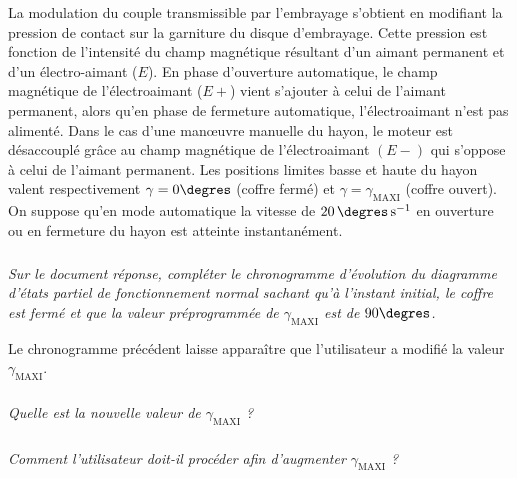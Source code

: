 \documentclass[10pt,fleqn]{article} %
\begin{document}
\begin{multicols}{2}
\begin{multicols}{2}
La modulation du couple transmissible par l’embrayage s’obtient en modifiant la pression de contact sur la garniture du disque d’embrayage. Cette pression est fonction de l’intensité du champ magnétique résultant d’un aimant permanent et d’un électro-aimant ($E$). En phase d’ouverture automatique, le champ magnétique de l’électroaimant ($E+$) vient s’ajouter à celui de l’aimant permanent, alors qu’en phase de fermeture automatique, l’électroaimant n’est pas alimenté. Dans le cas d’une man\oe{}uvre manuelle du hayon, le moteur est désaccouplé grâce au champ magnétique de l’électroaimant $(E-)$ qui s’oppose à celui de l’aimant permanent. Les positions limites basse et haute du hayon valent respectivement $\gamma=0\degres$ (coffre fermé) et $\gamma=\gamma_{\text{MAXI}}$ (coffre ouvert).
On suppose qu’en mode automatique la vitesse de $\SI{20}{\degres.s^{-1}}$ en ouverture ou en fermeture du hayon est atteinte instantanément.




\subparagraph{}
\textit{Sur le document réponse, compléter le chronogramme d’évolution du diagramme d’états partiel de fonctionnement normal sachant qu’à l’instant initial, le coffre est fermé et que la valeur préprogrammée de  $\gamma_{\text{MAXI}}$ est de $90\degres$. }
\ifprof
\begin{corrige}
\end{corrige}\else\fi

Le chronogramme précédent laisse apparaître que l’utilisateur a modifié la valeur $\gamma_{\text{MAXI}}$.


\subparagraph{}
\textit{Quelle est la nouvelle valeur de $\gamma_{\text{MAXI}}$ ?}
\ifprof
\begin{corrige}
\end{corrige}\else\fi 


\subparagraph{}
\textit{Comment l’utilisateur doit-il procéder afin d’augmenter $\gamma_{\text{MAXI}}$ ?
}
\ifprof
\begin{corrige}
\end{corrige}\else\fi

\ifprof
\end{multicols}
\else
\end{multicols}
\fi
\end{document}
